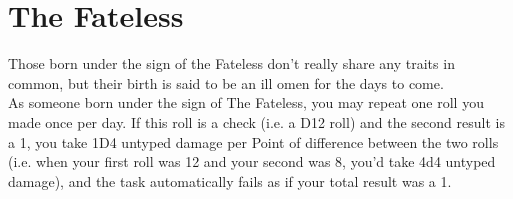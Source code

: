 \section{The Fateless}

Those born under the sign of the Fateless don't really share any traits in common, but their birth is said to be an ill omen for the days to come.\\
As someone born under the sign of The Fateless, you may repeat one roll you made once per day. If this roll is a check (i.e. a D12 roll) and the second result is a 1, you take 1D4 untyped damage per Point of difference between the two rolls (i.e. when your first roll was 12 and your second was 8, you'd take 4d4 untyped damage), and the task automatically fails as if your total result was a 1.\\